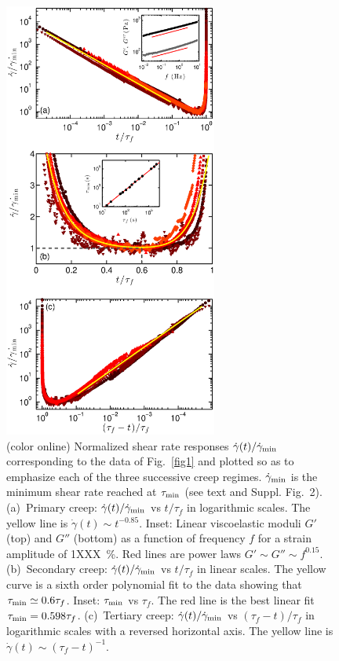 \documentclass[twocolumn,superscriptaddress,showpacs,preprintnumbers,amsmath,amssymb,prl]{revtex4}
\newcommand\gp{\dot\gamma}
\newcommand\gpm{\dot\gamma_{\rm min}}
\newcommand\taum{\tau_{\rm min}}
\begin{document}
\begin{figure}
\centering
\includegraphics[width=7cm,clip]{Fig2.eps}
\caption{(color online) Normalized shear rate responses $\gp(t)/\gpm$ corresponding to the data of Fig.~\ref{fig1} and plotted so as to emphasize each of the three successive creep regimes. $\gpm$ is the minimum shear rate reached at $\taum$ (see text and Suppl. Fig.~2). (a)~Primary creep: $\gp(t)/\gpm$ vs $t/\tau_f$ in logarithmic scales. The yellow line is $\gp(t)\sim t^{-0.85}$. Inset: Linear viscoelastic moduli $G'$ (top) and $G''$ (bottom) as a function of frequency $f$ for a strain amplitude of 1XXX~\%. Red lines are power laws $G'\sim G''\sim f^{0.15}$. (b)~Secondary creep: $\gp(t)/\gpm$ vs $t/\tau_f$ in linear scales. The yellow curve is a sixth order polynomial fit to the data showing that $\taum\simeq 0.6\tau_f$. Inset: $\taum$ vs $\tau_f$. The red line is the best linear fit $\taum=0.598\tau_f$. (c)~Tertiary creep: $\gp(t)/\gpm$ vs $(\tau_f-t)/\tau_f$ in logarithmic scales with a reversed horizontal axis. The yellow line is $\gp(t)\sim (\tau_f-t)^{-1}$. 
\label{fig2}}
\end{figure} 
\end{document}
